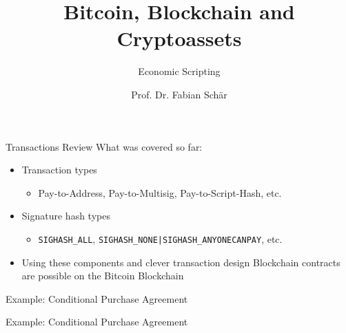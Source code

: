 \documentclass[handout]{beamer}
\title{Bitcoin, Blockchain and Cryptoassets}
\subtitle{Economic Scripting}
\author{Prof. Dr. Fabian Schär}
\institute{University of Basel}
\begin{document}
\thispagestyle{empty}
\begin{frame}[noframenumbering]
	\titlepage
\end{frame}


\begin{frame}{Transactions Review}
	What was covered so far:
	\begin{itemize}
		\item<1 -> Transaction types
		\begin{itemize}
			\item<1 -> Pay-to-Address, Pay-to-Multisig, Pay-to-Script-Hash, etc.
		\end{itemize}
		\item<2 -> Signature hash types
		\begin{itemize}
			\item<2 -> \texttt{SIGHASH\_ALL}, \texttt{SIGHASH\_NONE|SIGHASH\_ANYONECANPAY}, etc.
		\end{itemize}
		\item<3 -> Using these components and clever transaction design Blockchain contracts are possible on the Bitcoin Blockchain
	\end{itemize}
\end{frame}


\begin{frame}{Example: Conditional Purchase Agreement}
	
\end{frame}


\begin{frame}{Example: Conditional Purchase Agreement}
	
\end{frame}

\end{document}
